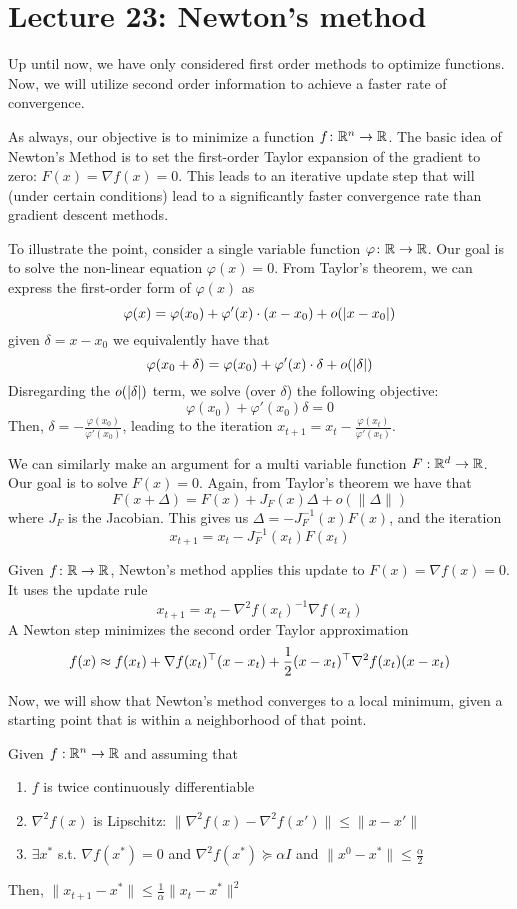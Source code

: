 \section{Lecture 23: Newton's method}
Up until now, we have only considered first order  methods to optimize functions. Now, we will utilize second order information to achieve a faster rate of convergence.

As always, our objective is to minimize a function $f\colon \mathbb{R}^n \rightarrow \mathbb{R}$. The basic idea of Newton's Method is to set the first-order Taylor expansion of the gradient to zero: $F(x) = \nabla f(x) = 0$. This leads to an iterative update step that will (under certain conditions) lead to a significantly faster convergence rate than gradient descent methods.

To illustrate the point, consider a single variable function $\varphi\colon\mathbb{R} \rightarrow \mathbb{R}$. Our goal is to solve the non-linear equation $\varphi(x) = 0$. From Taylor's theorem, we can express the first-order form of $\varphi(x)$ as
$$\varphi(x) = \varphi(x_0) + \varphi'(x) \cdot (x-x_0) + o(\lvert x-x_0\rvert)$$
given $\delta = x - x_0$ we equivalently have that
$$\varphi(x_0 + \delta) = \varphi(x_0) + \varphi'(x) \cdot \delta + o(\lvert\delta\rvert)$$
Disregarding the $o(\lvert\delta\rvert)$ term, we solve (over $\delta$) the following objective: $$\varphi(x_0) + \varphi'(x_0) \delta = 0$$
Then, $\delta = -\frac{\varphi(x_0)}{\varphi'(x_0)}$, leading to the iteration 
$x_{t+1} = x_t - \frac{\varphi(x_t)}{\varphi'(x_t)}$.

We can similarly make an argument for a multi variable function $F: \mathbb{R}^d \rightarrow \mathbb{R}$. Our goal is to solve $F(x) = 0$. Again, from Taylor's theorem we have that
$$F(x + \Delta) = F(x) +  J_F(x) \Delta + o(\| \Delta\|)$$
where $J_F$ is the Jacobian. This gives us
$\Delta = -J_F^{-1}(x)F(x)$, and the iteration
$$x_{t+1} = x_t - J_F^{-1}(x_t)F(x_t)$$

Given $f\colon \mathbb{R} \rightarrow \mathbb{R}$, Newton's method applies this update to $F(x) = \nabla f(x) = 0$. It uses the update rule
$$x_{t+1} = x_t - \nabla^2 f(x_t)^{-1} \nabla f(x_t)$$
A Newton step minimizes the second order Taylor approximation
$$f(x) \approx f(x_t) + \nabla f(x_t) ^\top (x - x_t) + \frac{1}{2} (x - x_t) ^\top \nabla^2 f(x_t) (x - x_t)$$

Now, we will show that Newton's method converges to a local minimum, 
given a starting point that is within a neighborhood of that point.
\begin{theorem}
Given $f: \mathbb{R}^n \rightarrow \mathbb{R}$ and assuming that
\begin{enumerate}
\item $f$ is twice continuously differentiable
\item $\nabla^2 f(x)$ is Lipschitz: $\| \nabla^2 f(x) - \nabla^2 f(x') \| \leq \|x-x'\|$
\item $\exists x^*$ s.t. $\nabla f(x^*) = 0$ and $\nabla^2 f(x^*) \succeq \alpha I$ and $\|x^0 - x^*\| \leq \frac{\alpha}{2}$
\end{enumerate}
Then, $\|x_{t+1} - x^*\| \leq \frac{1}{\alpha} \|x_t - x^*\|^2$
\end{theorem}

